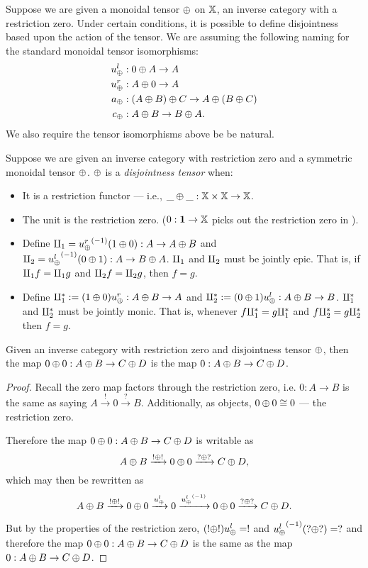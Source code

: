 Suppose we are given a monoidal tensor $\oplus$ on $\mathbb{X}$, an inverse category with a restriction zero.
Under certain conditions, it is possible to define disjointness based upon the action of the
tensor. We are assuming the following naming for the standard monoidal tensor
isomorphisms:
\begin{align*}
   u_{\oplus}^l &: 0 \oplus A \to A\\
   u_{\oplus}^r &: A \oplus 0 \to A\\
   a_\oplus &: (A \oplus B) \oplus C \to A \oplus (B \oplus C) \\
   c_\oplus &: A \oplus B \to B \oplus A.
 \end{align*}
We also require the tensor isomorphisms above be be natural.

\begin{definition}\label{def:disjointness_tensor}
  Suppose we are given an inverse category \X with restriction zero and a symmetric monoidal tensor
  $\oplus$. $\oplus$ is a \emph{disjointness tensor} when:
  \begin{itemize}
    \item It is a restriction functor --- i.e., $\_ \oplus \_ : \mathbb{X} \times \mathbb{X} \to \mathbb{X}$.
    \item The unit is the restriction zero. ($0 : \boldsymbol{1}\to \mathbb{X}$ picks out the restriction
    zero in \X).
    \item Define $\amalg_{1} = {u_{\oplus}^r}^{(-1)}(1\oplus0):A\to A\oplus B$ and $\amalg_{2} = {u_{\oplus}^l}^{(-1)}(0\oplus1): A\to B\oplus A$.
      $\amalg_{1}$ and $\amalg_{2}$ must be jointly epic. That is, if $\amalg_{1} f = \amalg_{1} g$ and $\amalg_{2} f = \amalg_{2} g$, then
      $f = g$.
    \item Define $\amalg_{1}^{*} := (1\oplus0)u_{\oplus}^r: A\oplus B \to A$ and $\amalg_{2}^{*} := (0\oplus1)u_{\oplus}^l:A\oplus B \to B$.
      $\amalg_{1}^{*}$  and $\amalg_{2}^{*}$ must be jointly monic. That is, whenever $f\amalg_{1}^{*} = g \amalg_{1}^{*}$ and
      $f\amalg_{2}^{*} = g\amalg_{2}^{*}$ then $f = g$.
  \end{itemize}

\end{definition}

\begin{lemma}\label{lem:zero_plus_zero_is_zero}
  Given an inverse category \X with restriction zero and disjointness tensor $\oplus$, then the map
  $0\oplus0: A\oplus B \to C\oplus D$ is the map $0: A\oplus B \to C\oplus D$.
\end{lemma}
\begin{proof}
  Recall the zero map factors through the restriction zero, i.e. $0:A \to B$ is the same as
  saying $A\xrightarrow{!} 0 \xrightarrow{?}B$. Additionally, as objects, $0\oplus0 \cong 0$ ---
  the restriction zero.

  Therefore the map $0\oplus0: A\oplus B \to C\oplus D$ is writable as
  \[
    A\oplus B \xrightarrow{!\oplus!}0\oplus0  \xrightarrow{?\oplus?} C\oplus D,
  \]
  which may then be rewritten as
  \[
    A\oplus B \xrightarrow{!\oplus!}0\oplus0 \xrightarrow{u_{\oplus}^l} 0
      \xrightarrow{{u_{\oplus}^l}^{(-1)}} 0\oplus0 \xrightarrow{?\oplus?} C\oplus D.
  \]

  But by the properties of the restriction zero, $(!\oplus!) u_{\oplus}^l = !$ and ${u_{\oplus}^l}^{(-1)}(?\oplus?) = ?$
  and therefore the map $0\oplus0: A\oplus B \to C\oplus D$ is the same as the map $0: A\oplus B \to C\oplus D$.
\end{proof}


